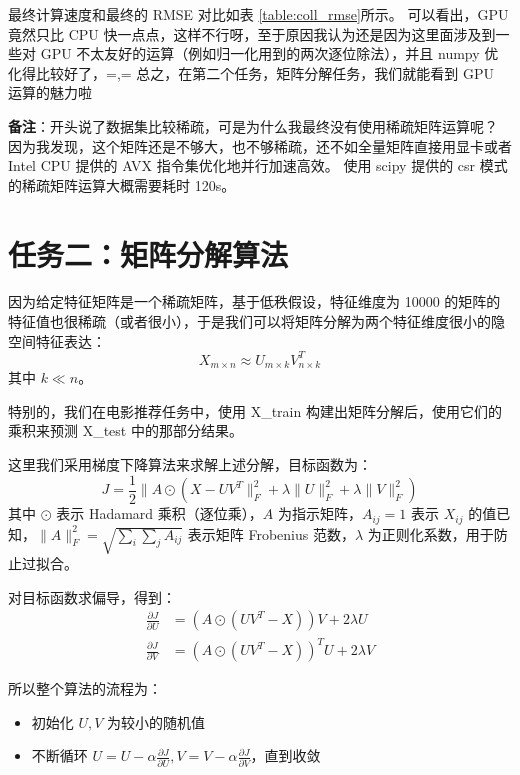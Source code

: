 \documentclass[degree=project, degree-type=project]{thuthesis}
\begin{document}
最终计算速度和最终的 RMSE 对比如表 \ref{table:coll_rmse}所示。
可以看出，GPU 竟然只比 CPU 快一点点，这样不行呀，至于原因我认为还是因为这里面涉及到一些对 GPU 不太友好的运算（例如归一化用到的两次逐位除法），并且 numpy 优化得比较好了，=,=
总之，在第二个任务，矩阵分解任务，我们就能看到 GPU 运算的魅力啦~

\textbf{备注}：开头说了数据集比较稀疏，可是为什么我最终没有使用稀疏矩阵运算呢？
因为我发现，这个矩阵还是不够大，也不够稀疏，还不如全量矩阵直接用显卡或者 Intel CPU 提供的 AVX 指令集优化地并行加速高效。
使用 scipy 提供的 csr 模式的稀疏矩阵运算大概需要耗时 120s。

\chapter{任务二：矩阵分解算法}

因为给定特征矩阵是一个稀疏矩阵，基于低秩假设，特征维度为 10000 的矩阵的特征值也很稀疏（或者很小），于是我们可以将矩阵分解为两个特征维度很小的隐空间特征表达：
\begin{equation}
X_{m \times n} \approx U_{m \times k} V_{n \times k}^T
\end{equation}
其中 $k \ll n$。

特别的，我们在电影推荐任务中，使用 X\_train 构建出矩阵分解后，使用它们的乘积来预测 X\_test 中的那部分结果。

这里我们采用梯度下降算法来求解上述分解，目标函数为：
\begin{equation}
J = \frac{1}{2} \lVert A \odot (X - UV^T \rVert_F^2 + \lambda \lVert U \rVert_F^2 + \lambda \lVert V \rVert_F^2)
\end{equation}
其中 $\odot$ 表示 Hadamard 乘积（逐位乘），$A$ 为指示矩阵，$A_{ij} = 1$ 表示 $X_{ij}$ 的值已知，$\lVert A \rVert_F^2 = \sqrt{\sum_i \sum_j A_{ij}}$ 表示矩阵 Frobenius 范数，$\lambda$ 为正则化系数，用于防止过拟合。

对目标函数求偏导，得到：
\begin{align}
  \frac{\partial J}{\partial U} &= (A \odot (UV^T - X))V + 2\lambda U\\
  \frac{\partial J}{\partial V} &= (A \odot (UV^T - X))^TU + 2\lambda V
\end{align}

所以整个算法的流程为：

\begin{itemize}
  \item 初始化 $U, V$ 为较小的随机值
  \item 不断循环 $U = U - \alpha \frac{\partial J}{\partial U}, V = V - \alpha \frac{\partial J}{\partial V}$，直到收敛
\end{itemize}
\end{document}

